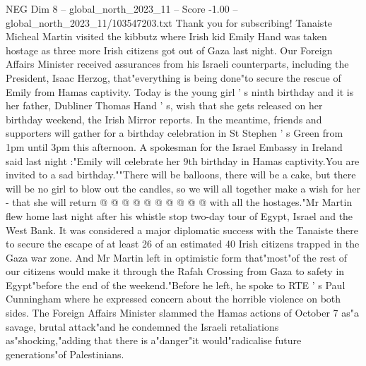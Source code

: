 \begin{textsample}{NEG Dim 8 – global\_north\_2023\_11 – Score -1.00 – global\_north\_2023\_11/103547203.txt}  \label{ex:f8_neg_337}
Thank you for subscribing!
Tanaiste Micheal Martin visited the kibbutz where Irish kid Emily Hand was taken hostage as three more Irish citizens got out of Gaza last night.
Our Foreign Affairs Minister received assurances from his Israeli counterparts, including the President, Isaac Herzog, that"everything is being done"to secure the rescue of Emily from Hamas captivity.
Today is the young girl ' s ninth birthday and it is her father, Dubliner Thomas Hand ' s, wish that she gets released on her birthday weekend, the Irish Mirror reports.
In the meantime, friends and supporters will gather for a birthday celebration in St Stephen ' s Green from 1pm until 3pm this afternoon.
A spokesman for the Israel Embassy in Ireland said last night :"Emily will celebrate her 9th birthday in Hamas captivity.You are invited to a sad birthday.""There will be balloons, there will be a cake, but there will be no girl to blow out the candles, so we will all together make a wish for her - that she will return @ @ @ @ @ @ @ @ @ @ with all the hostages."Mr Martin flew home last night after his whistle stop two-day tour of Egypt, Israel and the West Bank.
It was considered a major diplomatic success with the Tanaiste there to secure the escape of at least 26 of an estimated 40 Irish citizens trapped in the Gaza war zone.
And Mr Martin left in optimistic form that"most"of the rest of our citizens would make it through the Rafah Crossing from Gaza to safety in Egypt"before the end of the weekend."Before he left, he spoke to RTE ' s Paul Cunningham where he expressed concern about the horrible violence on both sides.
The Foreign Affairs Minister slammed the Hamas actions of October 7 as"a savage, brutal attack"and he condemned the Israeli retaliations as"shocking,"adding that there is a"danger"it would"radicalise future generations"of Palestinians.

\end{textsample}
